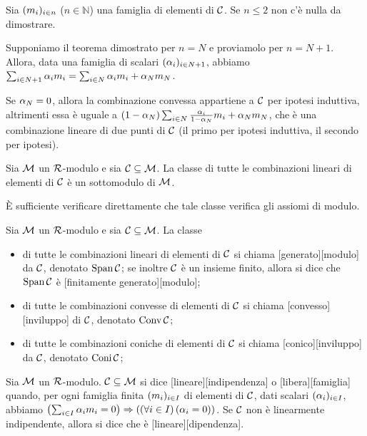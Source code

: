 \par Sia $(m_i)_{i \in n}$ ($n \in \mathbb{N}$) una famiglia di elementi di $\mathcal{C}$. Se $n \leq 2$ non c'\`e nulla da dimostrare.
\par Supponiamo il teorema dimostrato per $n = N$ e proviamolo per $n = N + 1$. Allora, data una famiglia di scalari $(\alpha_i)_{i \in N + 1}$, abbiamo $\sum_{i \in N + 1} \alpha_i m_i = \sum_{i \in N} \alpha_i m_i + \alpha_N m_N$.
\par Se $\alpha_N = 0$, allora la combinazione convessa appartiene a $\mathcal{C}$ per ipotesi induttiva, altrimenti essa \`e uguale a $(1 - \alpha_N) \sum_{i \in N} \frac{\alpha_i}{1 - \alpha_N} m_i + \alpha_N m_N$, che \`e una combinazione lineare di due punti di $\mathcal{C}$ (il primo per ipotesi induttiva, il secondo per ipotesi). \EndProof
\begin{Theorem}
	Sia $\mathcal{M}$ un $\mathcal{R}$-modulo e sia
	$\mathcal{C} \subseteq \mathcal{M}$. La classe di tutte le combinazioni
	lineari di elementi di $\mathcal{C}$ \`e un sottomodulo di $\mathcal{M}$.
\end{Theorem}
\Proof \`E sufficiente verificare direttamente che tale classe verifica
gli assiomi di modulo. \EndProof
\begin{Definition}
	Sia $\mathcal{M}$ un $\mathcal{R}$-modulo e sia
	$\mathcal{C} \subseteq \mathcal{M}$. La classe
	\begin{itemize}
		\item di tutte le combinazioni lineari di elementi di $\mathcal{C}$ si chiama
	[generato][modulo] da $\mathcal{C}$, denotato
	$\operatorname{Span}{\mathcal{C}}$; se inoltre $\mathcal{C}$ \`e un insieme finito, allora si dice che $\operatorname{Span}{\mathcal{C}}$ \`e [finitamente generato][modulo];
		\item di tutte le combinazioni convesse di elementi di $\mathcal{C}$ si chiama [convesso][inviluppo] di $\mathcal{C}$, denotato $\operatorname{Conv}{\mathcal{C}}$;
		\item di tutte le combinazioni coniche di elementi di $\mathcal{C}$ si chiama [conico][inviluppo] da $\mathcal{C}$, denotato $\operatorname{Coni}{\mathcal{C}}$;
	\end{itemize}
\end{Definition}
\begin{Definition}
	Sia $\mathcal{M}$ un $\mathcal{R}$-modulo. $\mathcal{C} \subseteq \mathcal{M}$ si
	dice [lineare][indipendenza] o
	[libera][famiglia]
	quando, per ogni famiglia finita $(m_i)_{i \in I}$
	di elementi di $\mathcal{C}$, dati scalari $(\alpha_i)_{i \in I}$,
	abbiamo
	$\left ( \sum_{i \in I} \alpha_i m_i = 0 \right ) \Rightarrow \left ( \left ( \forall 
	i \in I \right ) \left ( \alpha_i = 0 \right ) \right )$. Se $\mathcal{C}$ non \`e linearmente
	indipendente, allora si dice che \`e
	[lineare][dipendenza].
\end{Definition}
